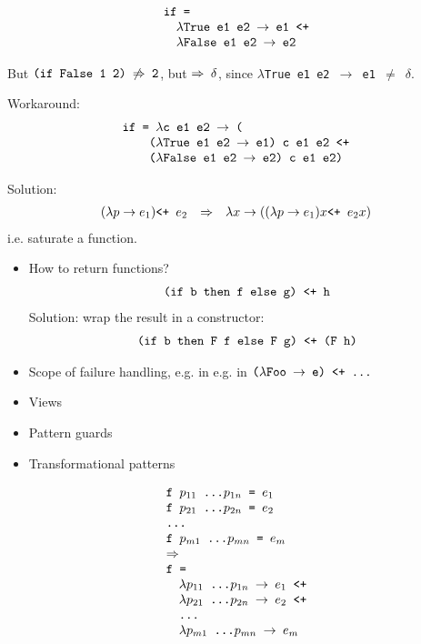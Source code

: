 \documentclass[leqno, fleqn]{foils}
\newcommand{\ve}[1]{\ensuremath{\text{\tt #1}}}
\newcommand{\vve}[1]{{\tt #1}}
\newcommand{\ra}{\ensuremath{\rightarrow} }
\newcommand{\Ra}{\ensuremath{\Rightarrow} }
\newcommand{\plus}{\ve{ <+ } }
\newcommand{\fail}{\ensuremath{\delta }}
\begin{document}
\[
\begin{array}{l}
\ve{if =} \\
\quad \ve{$\lambda$True e1 e2 \ra e1 <+} \\
\quad \ve{$\lambda$False e1 e2 \ra e2}
\end{array}
\]

But \ve{(if False 1 2) $\not \Rightarrow$ 2}, but \ve{\Ra $\delta$},
since \vve{$\lambda$True e1 e2 \ra e1 $\ne$ \fail}.

Workaround:
\[
\begin{array}{l}
\ve{if = $\lambda$c e1 e2 \ra (} \\
\ve{\quad \quad ($\lambda$True e1 e2 \ra e1) c e1 e2 <+} \\
\ve{\quad \quad ($\lambda$False e1 e2 \ra e2) c e1 e2)}
\end{array}
\]

Solution:
\[
\begin{array}{rcll}
(\lambda p \ra e_1) \plus e_2 & \Ra 
  & \lambda x \ra ((\lambda p \ra e_1) x \plus e_2 x)
\end{array}
\]
i.e. saturate a function.



\begin{itemize}
\item How to return functions?
\[
\begin{array}{l}
\ve{(if b then f else g) <+ h}
\end{array}
\]
Solution: wrap the result in a constructor:
\[
\begin{array}{l}
\ve{(if b then F f else F g) <+ (F h)}
\end{array}
\]
\item Scope of failure handling, 
  e.g. in e.g. in \ve{($\lambda$Foo \ra e) <+ ...}
\end{itemize}





\begin{itemize}
\item Views
\item Pattern guards
\item Transformational patterns
\end{itemize}



\[
\begin{array}{l}
\ve{f $p_{11}$ \ldots $p_{1n}$ = $e_1$} \\
\ve{f $p_{21}$ \ldots $p_{2n}$ = $e_2$} \\
\ve{\ldots} \\
\ve{f $p_{m1}$ \ldots $p_{mn}$ = $e_m$} \\
\Ra \\
\ve{f = } \\
\quad \ve{$\lambda p_{11}$ \ldots $p_{1n}$ \ra $e_1$ <+} \\
\quad \ve{$\lambda p_{21}$ \ldots $p_{2n}$ \ra $e_2$ <+} \\
\quad \ve{\ldots} \\
\quad \ve{$\lambda p_{m1}$ \ldots $p_{mn}$ \ra $e_m$}
\end{array}
\]
\end{document}
